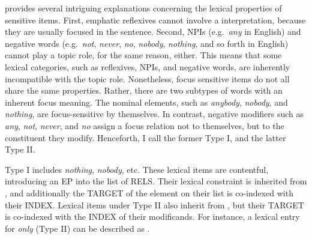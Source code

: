 \citet{lambrecht:96} provides several intriguing explanations
concerning the lexical properties of  sensitive
items. First, emphatic reflexives cannot
involve a  interpretation, because they are usually focused
in the sentence. Second, NPIs (e.g.\ \textit{any} in English) and
negative words (e.g.\ \textit{not}, \textit{never}, \textit{no},
\textit{nobody}, \textit{nothing}, and so forth in English) cannot
play a topic role, for the same reason, either. This means that some
lexical categories, such as reflexives, NPIs, and negative words, are
inherently incompatible with the topic role. Nonetheless, focus
sensitive items do not all share the same properties.  Rather, there
are two subtypes of words with an inherent focus meaning. The nominal
elements, such as \textit{anybody}, \textit{nobody}, and
\textit{nothing}, are focus-sensitive by themselves. In contrast,
negative modifiers such as \textit{any}, \textit{not},
\textit{never}, and \textit{no} assign a focus relation not to
themselves, but to the constituent they modify. Henceforth, I call the
former Type I, and the latter Type II.





\noindent Type I includes \textit{nothing}, \textit{nobody},
etc. These lexical items are contentful, introducing an EP into the
list of RELS. Their lexical constraint is inherited from
, and additionally the TARGET of the element
on their  list is co-indexed with their INDEX.  Lexical
items under Type II also inherit from , but
their TARGET is co-indexed with the INDEX of their modificands.  For
instance, a lexical entry for \textit{only} (Type II) can be described
as . 



